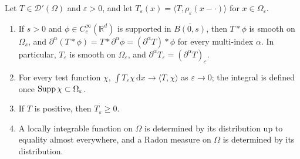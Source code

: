 \begin{proposition}\label{prop:distribution-smoothing}
Let $T\in\mathcal D'(\Omega)$ and $\varepsilon>0$, and let $T_\varepsilon(x)=\langle T,\rho_\varepsilon(x-\cdot)\rangle$ for $x\in\Omega_\varepsilon$.
\begin{enumerate}
\item If $s>0$ and $\phi\in C_c^\infty(\mathbb R^d)$ is supported in $\overline{B(0,s)}$, then $T*\phi$ is smooth on $\Omega_s$, and $\partial^\alpha(T*\phi)=T*\partial^\alpha\phi=(\partial^\alpha T)*\phi$ for every multi-index $\alpha$. In particular, $T_\varepsilon$ is smooth on $\Omega_\varepsilon$, and $\partial^\alpha T_\varepsilon=(\partial^\alpha T)_\varepsilon$.
\item For every test function $\chi$, $\int T_\varepsilon\chi\,\mathrm d x\to\langle T,\chi\rangle$ as $\varepsilon\to0$; the integral is defined once $\operatorname{Supp}\chi\subset\Omega_\varepsilon$.
\item If $T$ is positive, then $T_\varepsilon\geq0$.
\item A locally integrable function on $\Omega$ is determined by its distribution up to equality almost everywhere, and a Radon measure on $\Omega$ is determined by its distribution.
\end{enumerate}
\end{proposition}
